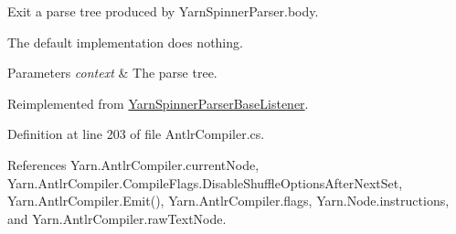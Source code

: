 Exit a parse tree produced by Yarn\-Spinner\-Parser.\-body. 

The default implementation does nothing.


\begin{DoxyParams}{Parameters}
{\em context} & The parse tree.\\
\hline
\end{DoxyParams}


Reimplemented from \hyperlink{a00196_ab0f6c8acd95f6213546c6f1f8370fd67}{Yarn\-Spinner\-Parser\-Base\-Listener}.



Definition at line 203 of file Antlr\-Compiler.\-cs.



References Yarn.\-Antlr\-Compiler.\-current\-Node, Yarn.\-Antlr\-Compiler.\-Compile\-Flags.\-Disable\-Shuffle\-Options\-After\-Next\-Set, Yarn.\-Antlr\-Compiler.\-Emit(), Yarn.\-Antlr\-Compiler.\-flags, Yarn.\-Node.\-instructions, and Yarn.\-Antlr\-Compiler.\-raw\-Text\-Node.


